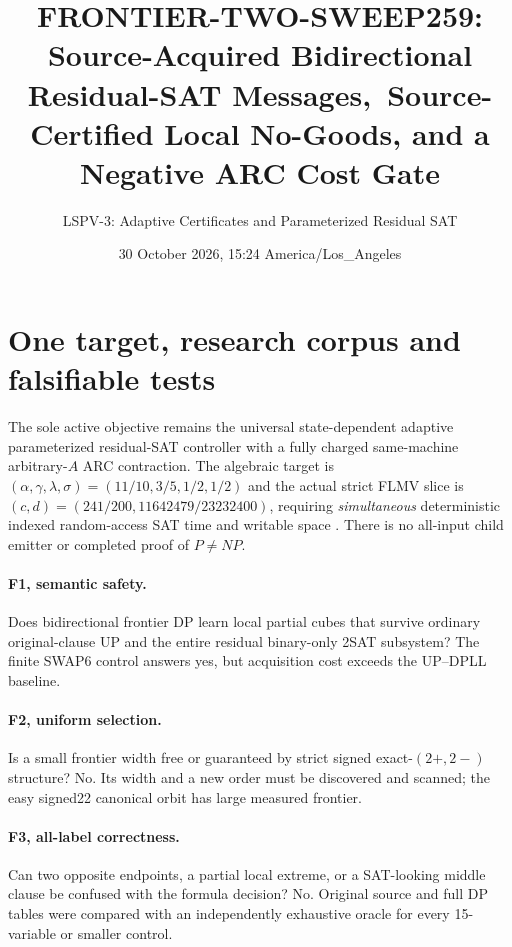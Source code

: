 \documentclass[10pt]{article}
\title{FRONTIER-TWO-SWEEP259: Source-Acquired Bidirectional Residual-SAT Messages,\ Source-Certified Local No-Goods, and a Negative ARC Cost Gate}
\author{LSPV-3: Adaptive Certificates and Parameterized Residual SAT}
\date{30 October 2026, 15:24 America/Los\_Angeles}
\begin{document}
\maketitle
\noindent{}

\section{One target, research corpus and falsifiable tests}
The sole active objective remains the universal state-dependent adaptive parameterized residual-SAT controller with a fully charged same-machine arbitrary-$A$ ARC contraction. The algebraic target is $(\alpha,\gamma,\lambda,\sigma)=(11/10,3/5,1/2,1/2)$ and the actual strict FLMV slice is $(c,d)=(241/200,11642479/23232400)$, requiring \emph{simultaneous} deterministic indexed random-access SAT time and writable space \cite{flmv}. There is no all-input child emitter or completed proof of $P\ne NP$.

\paragraph{F1, semantic safety.} Does bidirectional frontier DP learn local partial cubes that survive ordinary original-clause UP and the entire residual binary-only 2SAT subsystem? The finite SWAP6 control answers yes, but acquisition cost exceeds the UP--DPLL baseline.
\paragraph{F2, uniform selection.} Is a small frontier width free or guaranteed by strict signed exact-$(2+,2-)$ structure? No. Its width and a new order must be discovered and scanned; the easy signed22 canonical orbit has large measured frontier.
\paragraph{F3, all-label correctness.} Can two opposite endpoints, a partial local extreme, or a SAT-looking middle clause be confused with the formula decision? No. Original source and full DP tables were compared with an independently exhaustive oracle for every 15-variable or smaller control.
\end{document}
